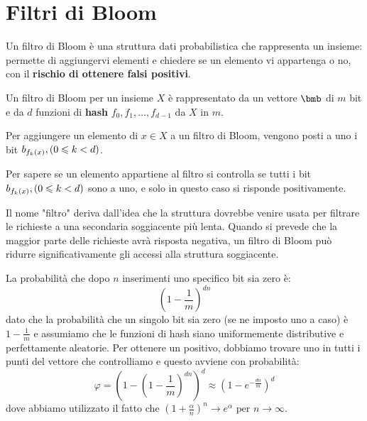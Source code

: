 \documentclass[\main/main.tex]{subfiles}
\begin{document}
\chapter{Filtri di Bloom}
\begin{multicols}{2}
\begin{definition}
    Un filtro di Bloom è una struttura dati probabilistica che rappresenta un insieme: permette di aggiungervi elementi e chiedere se un elemento vi appartenga o no, con il \textbf{rischio di ottenere falsi positivi}.
\end{definition}
\begin{observation}
    Un filtro di Bloom per un insieme \(X\) è rappresentato da un vettore \(\bmb\) di \(m\) bit e da \(d\) funzioni di \textbf{hash} \(f_0, f_1, \ldots, f_{d-1}\) da \(X\) in \(m\).
\end{observation}
\begin{observation}
    Per aggiungere un elemento di \(x \in X\) a un filtro di Bloom, vengono posti a uno i bit \(b_{f_{k}\left(x\right)}, \left(0 \leqslant k < d\right)\).
\end{observation}
\begin{observation}
    Per sapere se un elemento appartiene al filtro si controlla se tutti i bit \(b_{f_{k}\left(x\right)}, \left(0 \leqslant k < d\right)\) sono a uno, e solo in questo caso si risponde positivamente.
\end{observation}
\begin{observation}
    Il nome "filtro" deriva dall'idea che la struttura dovrebbe venire usata per filtrare le richieste a una secondaria soggiacente più lenta. Quando si prevede che la maggior parte delle richieste avrà risposta negativa, un filtro di Bloom può ridurre significativamente gli accessi alla struttura soggiacente.
\end{observation}
\vfill\null
\columnbreak
\begin{analysis}
    La probabilità che dopo \(n\) inserimenti uno specifico bit sia zero è:
    \[
        \left(1-\frac{1}{m}\right)^{d n}
    \]
    dato che la probabilità che un singolo bit sia zero (se ne imposto uno a caso) è \(1-\frac{1}{m}\) e assumiamo che le funzioni di hash siano uniformemente distributive e perfettamente aleatorie. Per ottenere un positivo, dobbiamo trovare uno in tutti i punti del vettore che controlliamo e questo avviene con probabilità:
    \[
        \varphi=\left(1-\left(1-\frac{1}{m}\right)^{d n}\right)^{d} \approx\left(1-e^{-\frac{d n}{m}}\right)^{d}
    \]
    dove abbiamo utilizzato il fatto che \((1+\frac{\alpha}{n})^{n} \rightarrow e^{\alpha} \text { per } n \rightarrow \infty\).
    

\end{analysis}
\end{multicols}
\end{document}
